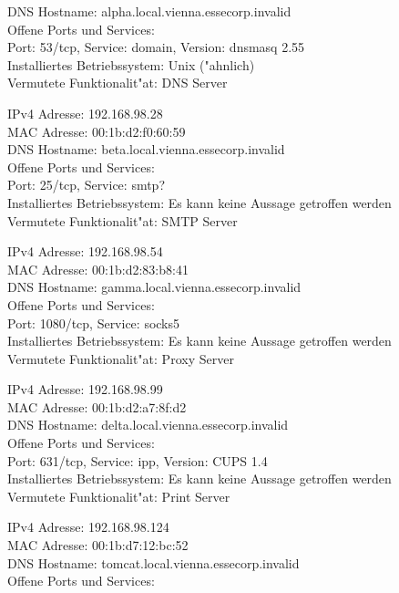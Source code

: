 \documentclass[12pt,a4paper,titlepage,oneside]{scrartcl}
\begin{document}
\begin{description}
DNS Hostname: alpha.local.vienna.essecorp.invalid\\
Offene Ports und Services:\\
Port: 53/tcp, Service: domain, Version: dnsmasq 2.55\\
Installiertes Betriebssystem: Unix ("ahnlich)\\
Vermutete Funktionalit"at: DNS Server\\
\item
IPv4 Adresse: 192.168.98.28\\
MAC Adresse: 00:1b:d2:f0:60:59\\
DNS Hostname: beta.local.vienna.essecorp.invalid\\
Offene Ports und Services:\\
Port: 25/tcp, Service: smtp?\\
Installiertes Betriebssystem: Es kann keine Aussage getroffen werden\\
Vermutete Funktionalit"at: SMTP Server\\
\item
IPv4 Adresse: 192.168.98.54\\
MAC Adresse: 00:1b:d2:83:b8:41\\
DNS Hostname: gamma.local.vienna.essecorp.invalid\\
Offene Ports und Services:\\
Port: 1080/tcp, Service: socks5\\
Installiertes Betriebssystem: Es kann keine Aussage getroffen werden\\
Vermutete Funktionalit"at: Proxy Server\\
\item
IPv4 Adresse: 192.168.98.99\\
MAC Adresse: 00:1b:d2:a7:8f:d2\\
DNS Hostname: delta.local.vienna.essecorp.invalid\\
Offene Ports und Services:\\
Port: 631/tcp, Service: ipp, Version: CUPS 1.4\\
Installiertes Betriebssystem: Es kann keine Aussage getroffen werden\\
Vermutete Funktionalit"at: Print Server\\
\item
IPv4 Adresse: 192.168.98.124\\
MAC Adresse: 00:1b:d7:12:bc:52\\
DNS Hostname: tomcat.local.vienna.essecorp.invalid\\
Offene Ports und Services:\\

\end{description}
\end{document}
